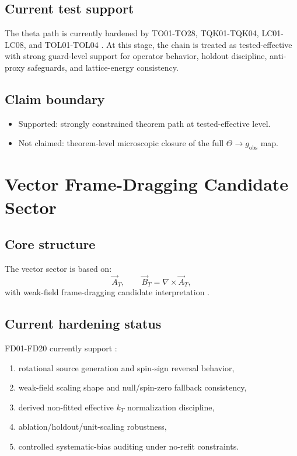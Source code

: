 \documentclass[11pt,a4paper]{article}
\begin{document}
\subsection{Current test support}

The theta path is currently hardened by TO01-TO28, TQK01-TQK04, LC01-LC08, and TOL01-TOL04 \cite{theta_theorem_path,trm_status_v3}. At this stage, the chain is treated as tested-effective with strong guard-level support for operator behavior, holdout discipline, anti-proxy safeguards, and lattice-energy consistency.

\subsection{Claim boundary}

\begin{itemize}
  \item Supported: strongly constrained theorem path at tested-effective level.
  \item Not claimed: theorem-level microscopic closure of the full \(\Theta \rightarrow g_{\mathrm{obs}}\) map.
\end{itemize}

\section{Vector Frame-Dragging Candidate Sector}

\subsection{Core structure}

The vector sector is based on:
\[
\vec A_T,\qquad \vec B_T=\nabla\times\vec A_T,
\]
with weak-field frame-dragging candidate interpretation \cite{vector_extension,lense_thirring}.

\subsection{Current hardening status}

FD01-FD20 currently support \cite{vector_extension,trm_status_v3}:
\begin{enumerate}
  \item rotational source generation and spin-sign reversal behavior,
  \item weak-field scaling shape and null/spin-zero fallback consistency,
  \item derived non-fitted effective \(k_T\) normalization discipline,
  \item ablation/holdout/unit-scaling robustness,
  \item controlled systematic-bias auditing under no-refit constraints.
\end{enumerate}
\end{document}
